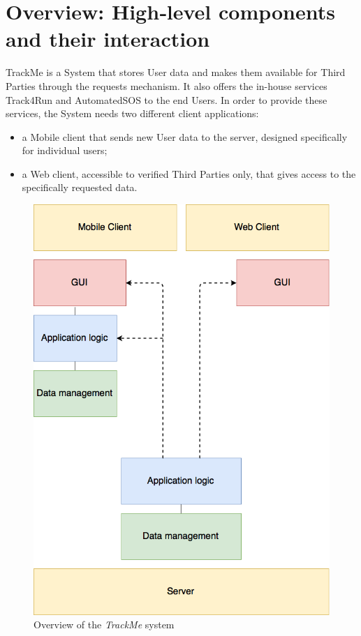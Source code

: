 \section{Overview: High‐level components and their interaction}

TrackMe is a System that stores User data and makes them available for Third Parties through the requests mechanism. It also offers the in-house services Track4Run and AutomatedSOS to the end Users. In order to provide these services, the System needs two different client applications: 

\begin{itemize}[leftmargin=*]
        \item{a Mobile client that sends new User data to the server, designed specifically for individual users;}
        \item{a Web client, accessible to verified Third Parties only, that gives access to the specifically requested data.}
\end{itemize}

\begin{figure}[H]
	\includegraphics[scale=0.3,keepaspectratio]{./Pictures/arch-design.png}
	\centering
	\caption{Overview of the \textit{TrackMe} system}
\end{figure}

